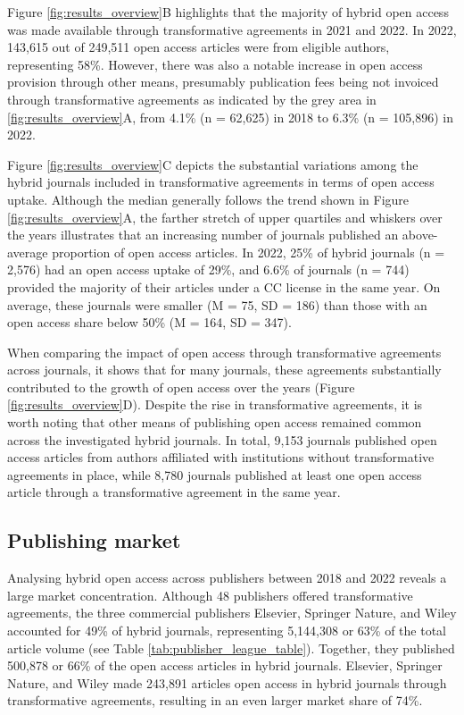 \documentclass[a4paper,man,floatsintext,longtable,noextraspace,12pt]{apa6}
\begin{document}
Figure \ref{fig:results_overview}B highlights that the majority of
hybrid open access was made available through transformative agreements
in 2021 and 2022. In 2022, 143,615 out of 249,511 open access articles
were from eligible authors, representing 58\%. However, there was also a
notable increase in open access provision through other means,
presumably publication fees being not invoiced through transformative
agreements as indicated by the grey area in \ref{fig:results_overview}A,
from 4.1\% (n = 62,625) in 2018 to 6.3\% (n = 105,896) in 2022.

Figure \ref{fig:results_overview}C depicts the substantial variations
among the hybrid journals included in transformative agreements in terms
of open access uptake. Although the median generally follows the trend
shown in Figure \ref{fig:results_overview}A, the farther stretch of
upper quartiles and whiskers over the years illustrates that an
increasing number of journals published an above-average proportion of
open access articles. In 2022, 25\% of hybrid journals (n = 2,576) had
an open access uptake of 29\%, and 6.6\% of journals (n = 744) provided
the majority of their articles under a CC license in the same year. On
average, these journals were smaller (M = 75, SD = 186) than those with
an open access share below 50\% (M = 164, SD = 347).

When comparing the impact of open access through transformative
agreements across journals, it shows that for many journals, these
agreements substantially contributed to the growth of open access over
the years (Figure \ref{fig:results_overview}D). Despite the rise in
transformative agreements, it is worth noting that other means of
publishing open access remained common across the investigated hybrid
journals. In total, 9,153 journals published open access articles from
authors affiliated with institutions without transformative agreements
in place, while 8,780 journals published at least one open access
article through a transformative agreement in the same year.

\subsection{Publishing market}\label{publishing-market}

Analysing hybrid open access across publishers between 2018 and 2022
reveals a large market concentration. Although 48 publishers offered
transformative agreements, the three commercial publishers Elsevier,
Springer Nature, and Wiley accounted for 49\% of hybrid journals,
representing 5,144,308 or 63\% of the total article volume (see Table
\ref{tab:publisher_league_table}). Together, they published 500,878 or
66\% of the open access articles in hybrid journals. Elsevier, Springer
Nature, and Wiley made 243,891 articles open access in hybrid journals
through transformative agreements, resulting in an even larger market
share of 74\%.
\end{document}
